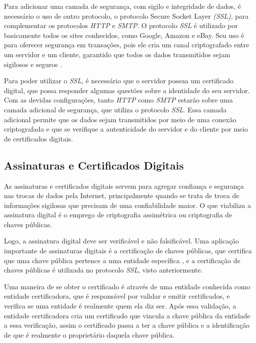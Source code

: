Para adicionar uma camada de segurança, com sigilo e integridade de dados, é necessário
o uso de outro protocolo, o protocolo Secure Socket Layer \textit{(SSL)}, para 
complementar os protocolos \textit{HTTP} e \textit{SMTP}. O protocolo \textit{SSL} 
é utilizado por basicamente todos os sites conhecidos, como Google,
Amazon e eBay. Seu uso é para oferecer segurança em transações, pois ele cria um
canal criptografado entre um servidor e um cliente, garantido que todos os
dados transmitidos sejam sigilosos e seguros \cite{kurose2010redes}. 

Para poder utilizar o \textit{SSL}, é necessário que o servidor 
possua um certificado digital, que possa responder algumas questões sobre a 
identidade do seu servidor. Com as devidas configurações, tanto \textit{HTTP} como 
\textit{SMTP} estarão sobre uma camada adicional de segurança, que utiliza o 
protocolo \textit{SSL}. Essa camada adicional permite que os dados sejam 
transmitidos por meio de uma conexão criptografada e que se verifique a autenticidade
do servidor e do cliente por meio de certificados digitais. 

\subsection{Assinaturas e Certificados Digitais}

As assinaturas e certificados digitais servem para agregar confiança e segurança
nas trocas de dados pela Internet, principalmente quando se trata de troca de informações
sigilosas que precisam de uma confiabilidade maior. O que viabiliza a assinatura 
digital é o emprego de criptografia assimétrica ou criptografia de chaves públicas. 

Logo, a assinatura digital deve ser verificável e não falsificável. Uma
aplicação importante de assinaturas digitais é a certificação de chaves públicas,
que certifica que uma chave pública pertence a uma entidade específica \cite{kurose2010redes},
e a certificação de chaves públicas é utilizada no protocolo \textit{SSL}, visto anteriormente.

Uma maneira de se obter o certificado é através de uma entidade conhecida como
entidade certificadora, que é responsável por validar e emitir certificados, e
verifica se uma entidade é realmente quem ela diz ser. Após essa validação, a
entidade certificadora cria um certificado que vincula a chave pública da entidade
a essa verificação, assim o certificado passa a ter a chave pública e a
identificação de que é realmente o proprietário daquela chave pública.

